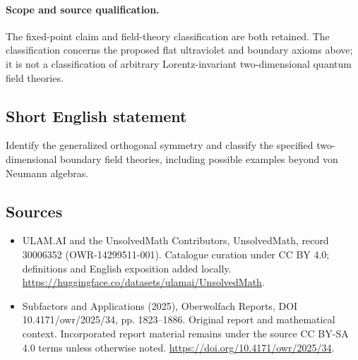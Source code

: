 \documentclass[11pt]{article}
\begin{document}
\paragraph{Scope and source qualification.}The fixed-point claim and field-theory classification are both retained. The classification concerns the proposed flat ultraviolet and boundary axioms above; it is not a classification of arbitrary Lorentz-invariant two-dimensional quantum field theories.
\subsection{Short English statement}
Identify the generalized orthogonal symmetry and classify the specified two-dimensional boundary field theories, including possible examples beyond von Neumann algebras.
\subsection{Sources}
\begin{itemize}
\item[\hypertarget{source:30006352:1}{S1}] ULAM.AI and the UnsolvedMath Contributors, UnsolvedMath, record 30006352 (OWR-14299511-001). Catalogue curation under CC BY 4.0; definitions and English exposition added locally.
\url{https://huggingface.co/datasets/ulamai/UnsolvedMath}.
\item[\hypertarget{source:30006352:2}{S2}] Subfactors and Applications (2025), Oberwolfach Reports, DOI 10.4171/owr/2025/34, pp. 1823--1886. Original report and mathematical context. Incorporated report material remains under the source CC BY-SA 4.0 terms unless otherwise noted.
\url{https://doi.org/10.4171/owr/2025/34}.
\end{itemize}
\label{end:30006352}
\end{document}
